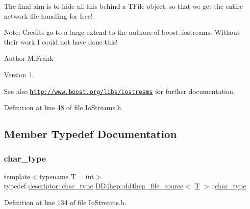 The final aim is to hide all this behind a T\+File object, so that we get the entire network file handling for free!

Note\+: Credits go to a large extend to the authors of boost\+::iostreams. Without their work I could not have done this!

\begin{DoxyAuthor}{Author}
M.\+Frank 
\end{DoxyAuthor}
\begin{DoxyVersion}{Version}
1.
\end{DoxyVersion}
\begin{DoxySeeAlso}{See also}
\href{http://www.boost.org/libs/iostreams}{\tt http\+://www.\+boost.\+org/libs/iostreams} for further documentation. 
\end{DoxySeeAlso}


Definition at line 48 of file Io\+Streams.\+h.



\subsection{Member Typedef Documentation}
\hypertarget{class_d_d4hep_1_1dd4hep__file__source_ad18eef60f1b38b5958eec9f287dac85a}{}\label{class_d_d4hep_1_1dd4hep__file__source_ad18eef60f1b38b5958eec9f287dac85a} 
\subsubsection{\texorpdfstring{char\+\_\+type}{char\_type}}
{\footnotesize\ttfamily template$<$typename T = int$>$ \\
typedef \hyperlink{class_d_d4hep_1_1dd4hep__file_aef4242f7f2fe15a59f7bf7a8f6ba24d5}{descriptor\+::char\+\_\+type} \hyperlink{class_d_d4hep_1_1dd4hep__file__source}{D\+D4hep\+::dd4hep\+\_\+file\+\_\+source}$<$ \hyperlink{class_t}{T} $>$\+::\hyperlink{class_d_d4hep_1_1dd4hep__file_aef4242f7f2fe15a59f7bf7a8f6ba24d5}{char\+\_\+type}}



Definition at line 134 of file Io\+Streams.\+h.

\hypertarget{class_d_d4hep_1_1dd4hep__file__source_acd7bec0e43b763cf692f18ce75a4dba8}{}\label{class_d_d4hep_1_1dd4hep__file__source_acd7bec0e43b763cf692f18ce75a4dba8} 
